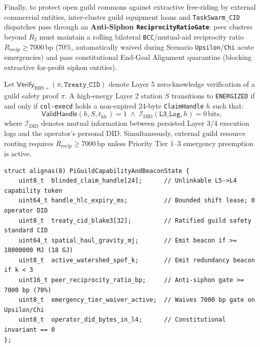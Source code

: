 Finally, to protect open guild commons against extractive free-riding by external commercial entities,
inter-cluster guild equipment loans and \texttt{TaskSwarm\_CID} dispatches pass through an
\textbf{Anti-Siphon \texttt{ReciprocityRatioGate}}: peer clusters beyond $R_2$ must maintain a rolling
bilateral \texttt{BCC}/mutual-aid reciprocity ratio $R_{\mathrm{recip}} \ge 7000\,\mathrm{bp}$ ($70\%$,
automatically waived during Scenario \texttt{Upsilon}/\texttt{Chi} acute emergencies) and pass constitutional
End-Goal Alignment quarantine (blocking extractive for-profit siphon entities).

\begin{theorem}
\label{thm:pi-bbs-capability}
Let $\mathsf{Verify}_{\mathrm{BBS+}}(\pi, \mathtt{Treaty\_CID})$ denote Layer 5 zero-knowledge verification
of a guild safety proof $\pi$. A high-energy Layer 2 station $S$ transitions to \texttt{ENERGIZED} if and
only if \texttt{col-execd} holds a non-expired 24-byte \texttt{ClaimHandle} $h$ such that:
\begin{equation}
\mathsf{ValidHandle}(h, S, t_{\mathrm{hlc}}) = 1 \;\land\; \mathcal{I}_{\mathrm{DID}}(\mathtt{L3\_Log}, h) = 0\,\mathrm{bits},
\end{equation}
where $\mathcal{I}_{\mathrm{DID}}$ denotes mutual information between persisted Layer 3/4 execution logs
and the operator's personal DID. Simultaneously, external guild resource routing requires
$R_{\mathrm{recip}} \ge 7000\,\mathrm{bp}$ unless Priority Tier 1--3 emergency preemption is active.
\end{theorem}

\begin{lstlisting}[caption={Scenario \texttt{Pi} Blinded BBS+ \texttt{ClaimHandle}, \texttt{MeshGrowthBeacon}, and Anti-Siphon Structs},label={lst:pi-structs}]
struct alignas(8) PiGuildCapabilityAndBeaconState {
    uint8_t  blinded_claim_handle[24];      // Unlinkable L5->L4 capability token
    uint64_t handle_hlc_expiry_ms;          // Bounded shift lease; 0 operator DID
    uint8_t  treaty_cid_blake3[32];         // Ratified guild safety standard CID
    uint64_t spatial_haul_gravity_mj;       // Emit beacon if >= 18000000 MJ (18 GJ)
    uint8_t  active_watershed_spof_k;       // Emit redundancy beacon if k < 3
    uint16_t peer_reciprocity_ratio_bp;     // Anti-siphon gate >= 7000 bp (70%)
    uint8_t  emergency_tier_waiver_active;  // Waives 7000 bp gate on Upsilon/Chi
    uint8_t  operator_did_bytes_in_l4;      // Constitutional invariant == 0
};
\end{lstlisting}

